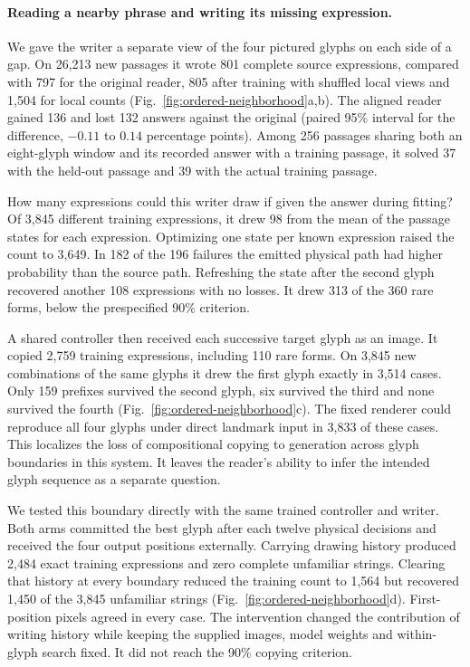 \paragraph{Reading a nearby phrase and writing its missing expression.}
We gave the writer a separate view of the four pictured glyphs on each side of a gap. On 26,213 new passages it wrote 801 complete source expressions, compared with 797 for the original reader, 805 after training with shuffled local views and 1,504 for local counts (Fig.~\ref{fig:ordered-neighborhood}a,b). The aligned reader gained 136 and lost 132 answers against the original (paired 95\% interval for the difference, $-0.11$ to $0.14$ percentage points). Among 256 passages sharing both an eight-glyph window and its recorded answer with a training passage, it solved 37 with the held-out passage and 39 with the actual training passage.

How many expressions could this writer draw if given the answer during fitting? Of 3,845 different training expressions, it drew 98 from the mean of the passage states for each expression. Optimizing one state per known expression raised the count to 3,649. In 182 of the 196 failures the emitted physical path had higher probability than the source path. Refreshing the state after the second glyph recovered another 108 expressions with no losses. It drew 313 of the 360 rare forms, below the prespecified 90\% criterion.

A shared controller then received each successive target glyph as an image. It copied 2,759 training expressions, including 110 rare forms. On 3,845 new combinations of the same glyphs it drew the first glyph exactly in 3,514 cases. Only 159 prefixes survived the second glyph, six survived the third and none survived the fourth (Fig.~\ref{fig:ordered-neighborhood}c). The fixed renderer could reproduce all four glyphs under direct landmark input in 3,833 of these cases. This localizes the loss of compositional copying to generation across glyph boundaries in this system. It leaves the reader's ability to infer the intended glyph sequence as a separate question.

We tested this boundary directly with the same trained controller and writer. Both arms committed the best glyph after each twelve physical decisions and received the four output positions externally. Carrying drawing history produced 2,484 exact training expressions and zero complete unfamiliar strings. Clearing that history at every boundary reduced the training count to 1,564 but recovered 1,450 of the 3,845 unfamiliar strings (Fig.~\ref{fig:ordered-neighborhood}d). First-position pixels agreed in every case. The intervention changed the contribution of writing history while keeping the supplied images, model weights and within-glyph search fixed. It did not reach the 90\% copying criterion.
